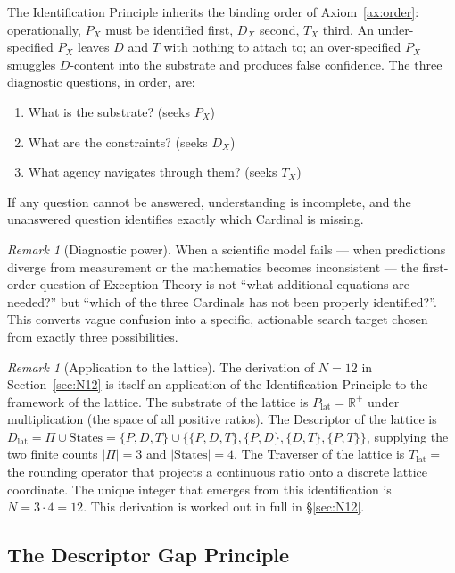 \documentclass[11pt,a4paper]{article}
\theoremstyle{definition}
\theoremstyle{remark}
\newtheorem{remark}[theorem]{Remark}
\newcommand{\R}{\mathbb{R}}
\begin{document}
The Identification Principle inherits the binding order of Axiom~\ref{ax:order}: operationally, $P_{X}$ must be identified first, $D_{X}$ second, $T_{X}$ third. An under-specified $P_{X}$ leaves $D$ and $T$ with nothing to attach to; an over-specified $P_{X}$ smuggles $D$-content into the substrate and produces false confidence. The three diagnostic questions, in order, are:
\begin{enumerate}[leftmargin=*,label=(\roman*)]
\item What is the substrate? (seeks $P_{X}$)
\item What are the constraints? (seeks $D_{X}$)
\item What agency navigates through them? (seeks $T_{X}$)
\end{enumerate}
If any question cannot be answered, understanding is incomplete, and the unanswered question identifies exactly which Cardinal is missing.

\begin{remark}[Diagnostic power]
When a scientific model fails --- when predictions diverge from measurement or the mathematics becomes inconsistent --- the first-order question of Exception Theory is not ``what additional equations are needed?'' but ``which of the three Cardinals has not been properly identified?''. This converts vague confusion into a specific, actionable search target chosen from exactly three possibilities.
\end{remark}

\begin{remark}[Application to the lattice]\label{rem:id-lattice}
The derivation of $N=12$ in Section~\ref{sec:N12} is itself an application of the Identification Principle to the framework of the lattice. The substrate of the lattice is $P_{\mathrm{lat}} = \R^{+}$ under multiplication (the space of all positive ratios). The Descriptor of the lattice is $D_{\mathrm{lat}} = \Pi \cup \mathrm{States} = \{P,D,T\} \cup \{\{P,D,T\},\{P,D\},\{D,T\},\{P,T\}\}$, supplying the two finite counts $|\Pi|=3$ and $|\mathrm{States}|=4$. The Traverser of the lattice is $T_{\mathrm{lat}} = $ the rounding operator that projects a continuous ratio onto a discrete lattice coordinate. The unique integer that emerges from this identification is $N = 3\cdot 4 = 12$. This derivation is worked out in full in \S\ref{sec:N12}.
\end{remark}

\subsection{The Descriptor Gap Principle}\label{subsec:descriptor-gap}
\end{document}
